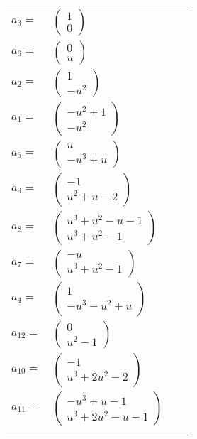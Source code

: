 \documentclass[1p]{elsarticle_modified}
\theoremstyle{definition}
\begin{document}
\begin{tabular}{m{7pt} m{180pt} m{7pt} m{180pt} }
\flushright $a_{3}=$&$\begin{pmatrix}1\\0\end{pmatrix}$ \\
\flushright $a_{6}=$&$\begin{pmatrix}0\\u\end{pmatrix}$ \\
\flushright $a_{2}=$&$\begin{pmatrix}1\\- u^2\end{pmatrix}$ \\
\flushright $a_{1}=$&$\begin{pmatrix}- u^2+1\\- u^2\end{pmatrix}$ \\
\flushright $a_{5}=$&$\begin{pmatrix}u\\- u^3+u\end{pmatrix}$ \\
\flushright $a_{9}=$&$\begin{pmatrix}-1\\u^2+u-2\end{pmatrix}$ \\
\flushright $a_{8}=$&$\begin{pmatrix}u^3+u^2- u-1\\u^3+u^2-1\end{pmatrix}$ \\
\flushright $a_{7}=$&$\begin{pmatrix}- u\\u^3+u^2-1\end{pmatrix}$ \\
\flushright $a_{4}=$&$\begin{pmatrix}1\\- u^3- u^2+u\end{pmatrix}$ \\
\flushright $a_{12}=$&$\begin{pmatrix}0\\u^2-1\end{pmatrix}$ \\
\flushright $a_{10}=$&$\begin{pmatrix}-1\\u^3+2 u^2-2\end{pmatrix}$ \\
\flushright $a_{11}=$&$\begin{pmatrix}- u^3+u-1\\u^3+2 u^2- u-1\end{pmatrix}$\\&\end{tabular}
\end{document}
